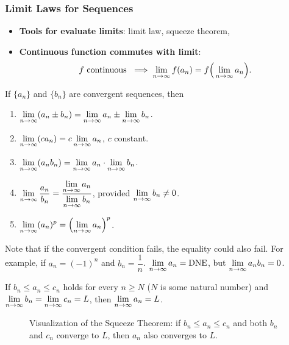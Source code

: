 \subsubsection{Limit Laws for Sequences}

\begin{center}
\begin{tcolorbox}
     \begin{itemize}
         \item \textbf{Tools for evaluate limits}: limit law, squeeze theorem, 
         \item \textbf{Continuous function commutes with limit}: 
         \[f \text{ continuous } \implies \displaystyle\lim_{n \to \infty} f(a_n) = f\Big(\displaystyle\lim_{n \to \infty} a_n \Big).\]
     \end{itemize}   
\end{tcolorbox}
\end{center}


If $\{a_n\}$ and $\{b_n\}$ are convergent sequences, then
\begin{enumerate}
    \item $\displaystyle\lim_{n \to \infty} (a_n \pm b_n) = \displaystyle\lim_{n \to \infty} a_n \pm \displaystyle\lim_{n \to \infty} b_n$.
    
    \item $\displaystyle\lim_{n \to \infty} (c a_n) = c \displaystyle\lim_{n \to \infty} a_n$, $c$ constant.
    
    \item $\displaystyle\lim_{n \to \infty} (a_n b_n) = \displaystyle\lim_{n \to \infty} a_n \cdot \lim_{n \to \infty} b_n$.
    
    \item $\displaystyle\lim_{n \to \infty} \dfrac{a_n}{b_n} = \dfrac{\displaystyle\lim_{n \to \infty} a_n}{\displaystyle\lim_{n \to \infty} b_n}$, provided $\displaystyle\lim_{n \to \infty} b_n \neq 0$.
    
    \item $\displaystyle\lim_{n \to \infty} (a_n)^p = \left(\displaystyle\lim_{n \to \infty} a_n \right)^p$.
\end{enumerate}

Note that if the convergent condition fails, the equality could also fail. For example, if $a_n = (-1)^n$ and $b_n = \dfrac{1}{n}$. $\displaystyle\lim_{n \to \infty} a_n = \mathrm{DNE}$, but $\displaystyle\lim_{n \to \infty} a_n b_n = 0$.

\begin{thm}
    If $b_n \leq a_n \leq c_n$ holds for every $n \geq N$ ($N$ is some natural number) and $\displaystyle\lim_{n \to \infty} b_n = \lim_{n \to \infty} c_n = L$, then $\displaystyle\lim_{n \to \infty} a_n = L$.
\end{thm}
\begin{figure}[h]
    \centering
    \resizebox{0.6\textwidth}{!}{} %
    \label{fig:squeeze thm}
    \caption{Visualization of the Squeeze Theorem: if $b_n \leq a_n \leq c_n$ and both $b_n$ and $c_n$ converge to $L$, then $a_n$ also converges to $L$.}
\end{figure}

